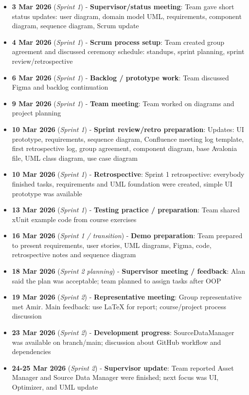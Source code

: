 \begin{itemize}[leftmargin=*,itemsep=0.5em]
\item \textbf{3 Mar 2026} (\textit{Sprint 1}) - \textbf{Supervisor/status meeting}: Team gave short status updates: user diagram, domain model UML, requirements, component diagram, sequence diagram, Scrum update
\item \textbf{4 Mar 2026} (\textit{Sprint 1}) - \textbf{Scrum process setup}: Team created group agreement and discussed ceremony schedule: standups, sprint planning, sprint review/retrospective
\item \textbf{6 Mar 2026} (\textit{Sprint 1}) - \textbf{Backlog / prototype work}: Team discussed Figma and backlog continuation
\item \textbf{9 Mar 2026} (\textit{Sprint 1}) - \textbf{Team meeting}: Team worked on diagrams and project planning
\item \textbf{10 Mar 2026} (\textit{Sprint 1}) - \textbf{Sprint review/retro preparation}: Updates: UI prototype, requirements, sequence diagram, Confluence meeting log template, first retrospective log, group agreement, component diagram, base Avalonia file, UML class diagram, use case diagram
\item \textbf{10 Mar 2026} (\textit{Sprint 1}) - \textbf{Retrospective}: Sprint 1 retrospective: everybody finished tasks, requirements and UML foundation were created, simple UI prototype was available
\item \textbf{13 Mar 2026} (\textit{Sprint 1}) - \textbf{Testing practice / preparation}: Team shared xUnit example code from course exercises
\item \textbf{16 Mar 2026} (\textit{Sprint 1 / transition}) - \textbf{Demo preparation}: Team prepared to present requirements, user stories, UML diagrams, Figma, code, retrospective notes and sequence diagram
\item \textbf{18 Mar 2026} (\textit{Sprint 2 planning}) - \textbf{Supervisor meeting / feedback}: Alan said the plan was acceptable; team planned to assign tasks after OOP
\item \textbf{19 Mar 2026} (\textit{Sprint 2}) - \textbf{Representative meeting}: Group representative met Amir. Main feedback: use LaTeX for report; course/project process discussion
\item \textbf{23 Mar 2026} (\textit{Sprint 2}) - \textbf{Development progress}: SourceDataManager was available on branch/main; discussion about GitHub workflow and dependencies
\item \textbf{24-25 Mar 2026} (\textit{Sprint 2}) - \textbf{Supervisor update}: Team reported Asset Manager and Source Data Manager were finished; next focus was UI, Optimizer, and UML update

\end{itemize}

